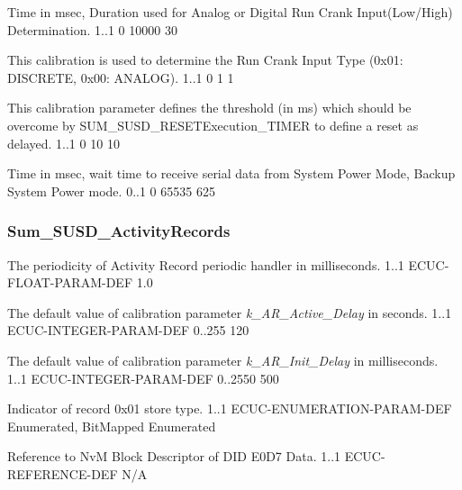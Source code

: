 {
{Time in msec, Duration used for Analog or Digital Run Crank Input(Low/High) Determination.}
{1..1}
{0}
{10000}
{30}}
{}

{
{This calibration is used to determine the Run Crank Input Type (0x01: DISCRETE, 0x00: ANALOG).}
{1..1}
{0}
{1}
{1}}
{   }

{
{This calibration parameter defines the threshold (in ms) which should be overcome by SUM_SUSD_RESETExecution_TIMER to define a reset as delayed.}
{1..1}
{0}
{10}
{10}}
{}

{ 
{Time in msec, wait time to receive serial data from System Power Mode, Backup System Power mode.}
{0..1}
{0}
{65535}
{625}}
{      }

\subsubsection{Sum_SUSD_ActivityRecords}
\label{subsubsec:e0d7ar}
{
{The periodicity of Activity Record periodic handler in milliseconds.}
{1..1}
{ECUC-FLOAT-PARAM-DEF}
{1.0}
{}}
{}

{
{The default value of calibration parameter \textit{k\_AR\_Active\_Delay} in seconds.}
{1..1}
{ECUC-INTEGER-PARAM-DEF}
{0..255}
{120}}
{}

{
{The default value of calibration parameter \textit{k\_AR\_Init\_Delay} in milliseconds.}
{1..1}
{ECUC-INTEGER-PARAM-DEF}
{0..2550}
{500}}
{}

{
{Indicator of record 0x01 store type.}
{1..1}
{ECUC-ENUMERATION-PARAM-DEF}
{Enumerated, BitMapped}
{Enumerated}}
{}

{
{Reference to NvM Block Descriptor of DID E0D7 Data.}
{1..1}
{ECUC-REFERENCE-DEF}
{N/A}
{}}
{}

